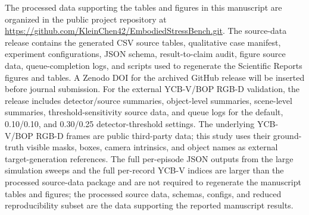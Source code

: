 The processed data supporting the tables and figures in this manuscript are organized in the public project repository at \url{https://github.com/KleinChen42/EmbodiedStressBench.git}. The source-data release contains the generated CSV source tables, qualitative case manifest, experiment configurations, JSON schema, result-to-claim audit, figure source data, queue-completion logs, and scripts used to regenerate the Scientific Reports figures and tables. A Zenodo DOI for the archived GitHub release will be inserted before journal submission. For the external YCB-V/BOP RGB-D validation, the release includes detector/source summaries, object-level summaries, scene-level summaries, threshold-sensitivity source data, and queue logs for the default, 0.10/0.10, and 0.30/0.25 detector-threshold settings. The underlying YCB-V/BOP RGB-D frames are public third-party data; this study uses their ground-truth visible masks, boxes, camera intrinsics, and object names as external target-generation references. The full per-episode JSON outputs from the large simulation sweeps and the full per-record YCB-V indices are larger than the processed source-data package and are not required to regenerate the manuscript tables and figures; the processed source data, schemas, configs, and reduced reproducibility subset are the data supporting the reported manuscript results.
